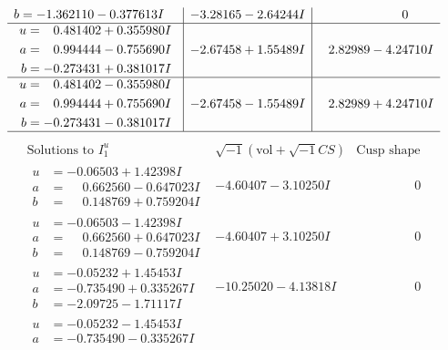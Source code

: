 \documentclass[1p]{elsarticle_modified}
\theoremstyle{definition}
\newcommand{\I}{\sqrt{-1}}
\begin{document}
$$\begin{array}{c|c|c}
\begin{aligned}
b &= -1.362110 - 0.377613 I\end{aligned}
 & -3.28165 - 2.64244 I & \phantom{-0.000000 } 0 \\ \hline\begin{aligned}
u &= \phantom{-}0.481402 + 0.355980 I \\
a &= \phantom{-}0.994444 - 0.755690 I \\
b &= -0.273431 + 0.381017 I\end{aligned}
 & -2.67458 + 1.55489 I & \phantom{-}2.82989 - 4.24710 I \\ \hline\begin{aligned}
u &= \phantom{-}0.481402 - 0.355980 I \\
a &= \phantom{-}0.994444 + 0.755690 I \\
b &= -0.273431 - 0.381017 I\end{aligned}
 & -2.67458 - 1.55489 I & \phantom{-}2.82989 + 4.24710 I\\
 \hline 
 \end{array}$$\newpage$$\begin{array}{c|c|c}  
\text{Solutions to }I^u_{1}& \I (\text{vol} + \sqrt{-1}CS) & \text{Cusp shape}\\
 \hline 
\begin{aligned}
u &= -0.06503 + 1.42398 I \\
a &= \phantom{-}0.662560 - 0.647023 I \\
b &= \phantom{-}0.148769 + 0.759204 I\end{aligned}
 & -4.60407 - 3.10250 I & \phantom{-0.000000 } 0 \\ \hline\begin{aligned}
u &= -0.06503 - 1.42398 I \\
a &= \phantom{-}0.662560 + 0.647023 I \\
b &= \phantom{-}0.148769 - 0.759204 I\end{aligned}
 & -4.60407 + 3.10250 I & \phantom{-0.000000 } 0 \\ \hline\begin{aligned}
u &= -0.05232 + 1.45453 I \\
a &= -0.735490 + 0.335267 I \\
b &= -2.09725 - 1.71117 I\end{aligned}
 & -10.25020 - 4.13818 I & \phantom{-0.000000 } 0 \\ \hline\begin{aligned}
u &= -0.05232 - 1.45453 I \\
a &= -0.735490 - 0.335267 I \\

\end{aligned}
\end{array}$$
\end{document}
